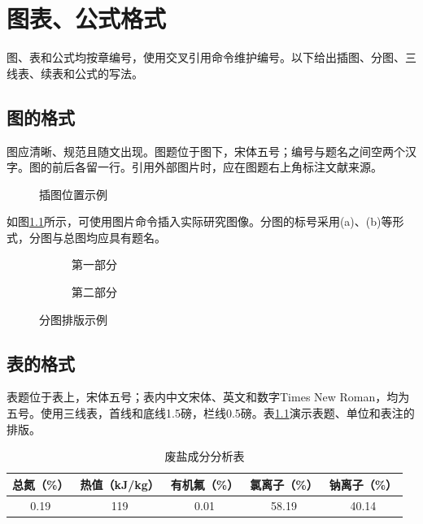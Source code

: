 \chapter{图表、公式格式}
图、表和公式均按章编号，使用交叉引用命令维护编号。以下给出插图、分图、三线表、续表和公式的写法。
\section{图的格式}
图应清晰、规范且随文出现。图题位于图下，宋体五号；编号与题名之间空两个汉字。图的前后各留一行。引用外部图片时，应在图题右上角标注文献来源。

\begin{figure}[htbp]
  \centering
  \caption{插图位置示例}\label{fig:placeholder}
\end{figure}

如图\ref{fig:placeholder}所示，可使用图片命令插入实际研究图像。分图的标号采用(a)、(b)等形式，分图与总图均应具有题名。

\begin{figure}[htbp]
  \centering
  \begin{subfigure}{0.46\linewidth}
    \centering{}
    \caption{第一部分}
  \end{subfigure}\hfill
  \begin{subfigure}{0.46\linewidth}
    \centering{}
    \caption{第二部分}
  \end{subfigure}
  \caption{分图排版示例}\label{fig:subfigures}
\end{figure}

\section{表的格式}
表题位于表上，宋体五号；表内中文宋体、英文和数字Times New Roman，均为五号。使用三线表，首线和底线1.5磅，栏线0.5磅。表\ref{tab:salt}演示表题、单位和表注的排版。

\begin{table}[htbp]
  \caption{废盐成分分析表}\label{tab:salt}
  \centering
  \begin{thesistable}
    \begin{tabular}{ccccc}
      \toprule
      总氮（\%）&热值（kJ/kg）&有机氟（\%）&氯离子（\%）&钠离子（\%）\\
      \midrule
      0.19&119&0.01&58.19&40.14\\
      \bottomrule
    \end{tabular}
  \end{thesistable}
\end{table}

